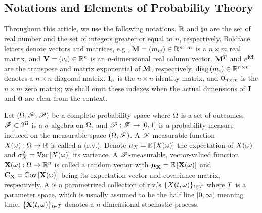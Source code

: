 \subsection{Notations and Elements of Probability Theory}
Throughout this article, we use the following notations. $\mathbb{R}$ and $\natural{n}$ are the set of real number and the set of integers greater or equal to $n$, respectively. Boldface letters denote vectors and matrices, e.g., $\m{M} = \mtx{m_{ij}} \in \real^{n \times m}$ is a $n \times m$ real matrix, and $\mathbf{V} = (v_i) \in \mathbb{R}^n$ is an $n$-dimensional real column vector. $\m{M}^T$ and $e^\m{M}$ are the transpose and matrix exponential of $\m{M}$, respectively. $\text{diag}\left(m_i\right) \in \mathbb{R}^{n \times n}$ denotes a $n \times n$ diagonal matrix. $\mI_n$ is the $n \times n$ identity matrix, and $\mZero_{n \times m}$ is the $n \times m$ zero matrix; we shall omit these indexes when the actual dimensions of $\mI$ and $\mZero$ are clear from the context.

Let $(\Omega, \mathscr{F}, \mathscr{P})$ be a complete probability space \cite{durrett2010} where $\Omega$ is a set of outcomes, $\mathscr{F} \subset 2^\Omega$ is a $\sigma$-algebra on $\Omega$, and $\mathscr{P}: \mathscr{F} \to [0, 1]$ is a probability measure induced on the measurable space $(\Omega, \mathscr{F})$. A $\mathscr{F}$-measurable function $\rv{X}(\o): \outcomes \to \real$ is called a  (r.v.). Denote $\exp_\rv{X} = \oExp{\rv{X}(\o)}$ the expectation of $\rv{X}(\o)$ and $\var_\rv{X} = \oVar{\rv{X}(\o)}$ its variance. A $\mathscr{P}$-measurable, vector-valued function $\mrv{X}(\o): \outcomes \to \real^n$ is called a random vector with $\vExp_\mrv{X} = \oExp{\mrv{X}(\o)}$ and $\mCov_\mrv{X} = \oCov{\mrv{X}(\o)}$ being its expectation vector and covariance matrix, respectively. A  is a parametrized collection of r.v.'s $\{ \rv{X}(\t, \o) \}_{\t \in \sTime}$ where $T$ is a parameter space, which is usually assumed to be the half line $[0, \infty)$ meaning time. $\{ \mrv{X}(\t, \o) \}_{\t \in \sTime}$ denotes a $n$-dimensional stochastic process.

